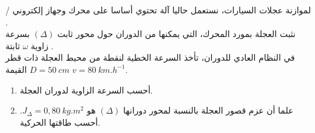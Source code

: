 \documentclass[12pt,a4paper]{article}
\begin{document}
					\begin{exercice}{}/
لموازنة عجلات السیارات، نستعمل حالیا آلة تحتوي أساسا على محرك وجھاز إلكتروني .
\\ نثبت
العجلة بمورد المحرك، التي يمكنھا من الدوران حول محور ثابت
$(\Delta)$
بسرعة زاوية
$\omega$
ثابتة .
\\في 
النظام العادي للدوران، تأخذ السرعة الخطیة لنقطة من محیط العجلة ذات قطر
$D = 50\ cm$
القیمة
$v=80\ km.h^{-1}$.
\begin{enumerate}
\item أحسب السرعة الزاوية لدوران العجلة.
\item علما أن عزم قصور العجلة بالنسبة لمحور دورانھا
$(\Delta)$
ھو
$J_\Delta = 0,80\ kg.m^2$.
أحسب طاقتھا الحركیة.
\end{enumerate}
	\end{exercice}%
\end{document}
